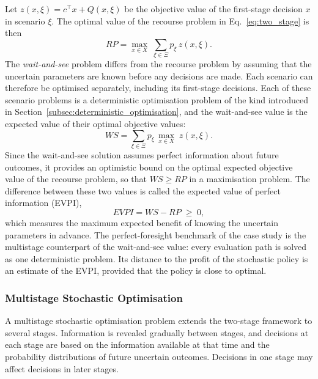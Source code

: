 Let $z(x,\xi)=c^{\top}x+Q(x,\xi)$ be the objective value of the first-stage decision $x$ in scenario $\xi$. The optimal value of the recourse problem in Eq.~\eqref{eq:two_stage} is then
\begin{equation}
RP=\max_{x\in X}\;\sum_{\xi\in\Xi}p_\xi\,z(x,\xi).
\label{eq:rp}
\end{equation}
The \textit{wait-and-see} problem differs from the
recourse problem by assuming that the uncertain
parameters are known before any decisions are made.
Each scenario can therefore be optimised separately,
including its first-stage decisions. Each of these scenario problems is a deterministic optimisation problem of the kind introduced in Section~\ref{subsec:deterministic_optimisation}, and the wait-and-see value is the expected value of their optimal objective values:
\begin{equation}
WS=\sum_{\xi\in\Xi}p_\xi\,\max_{x\in X}\;z(x,\xi).
\label{eq:ws}
\end{equation}
Since the wait-and-see solution assumes perfect information about future outcomes, it provides an optimistic bound on the optimal expected objective value of the recourse problem, so that $WS\ge RP$ in a maximisation problem. The difference between these two values
is called the expected value of perfect information
(EVPI),
\begin{equation}
EVPI=WS-RP\;\ge\;0,
\label{eq:evpi}
\end{equation}
which measures the maximum expected benefit
of knowing the uncertain parameters in advance. %
The perfect-foresight benchmark of the case study is the multistage counterpart of the wait-and-see value: every evaluation path is solved as one deterministic problem. Its distance to the profit of the stochastic policy is an estimate of the EVPI, provided that the policy is close to optimal.

\subsubsection{Multistage Stochastic Optimisation}
\label{subsec:multistage_stochastic_optimisation}

A multistage stochastic optimisation problem extends the two-stage
framework to several stages. Information is revealed gradually
between stages, and decisions at each stage are based on the
information available at that time and the probability
distributions of future uncertain outcomes.
Decisions in one stage may affect decisions in later stages.

